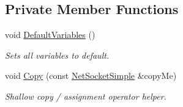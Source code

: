 \subsection*{Private Member Functions}
\begin{DoxyCompactItemize}
\item 
\hypertarget{class_net_socket_simple_a849d10ef2a3b2253949b39164681830e}{
void \hyperlink{class_net_socket_simple_a849d10ef2a3b2253949b39164681830e}{DefaultVariables} ()}
\label{class_net_socket_simple_a849d10ef2a3b2253949b39164681830e}

\begin{DoxyCompactList}\small\item\em Sets all variables to default. \item\end{DoxyCompactList}\item 
void \hyperlink{class_net_socket_simple_aaca0cc79a47e33bb1a0c9eb431e8307a}{Copy} (const \hyperlink{class_net_socket_simple}{NetSocketSimple} \&copyMe)
\begin{DoxyCompactList}\small\item\em Shallow copy / assignment operator helper. \item\end{DoxyCompactList}\end{DoxyCompactItemize}
